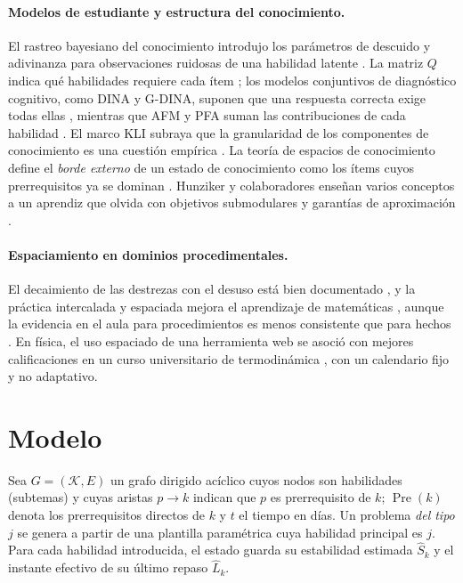 \documentclass[runningheads]{llncs}
\newcommand{\Pre}{\operatorname{Pre}}
\newcommand{\Sh}{\hat S}
\newcommand{\Lh}{\hat L}
\begin{document}
\paragraph{Modelos de estudiante y estructura del conocimiento.} El rastreo bayesiano del conocimiento introdujo los parámetros de descuido y adivinanza para observaciones ruidosas de una habilidad latente \cite{corbett1994}. La matriz $Q$ indica qué habilidades requiere cada ítem \cite{tatsuoka1983}; los modelos conjuntivos de diagnóstico cognitivo, como DINA y G-DINA, suponen que una respuesta correcta exige todas ellas \cite{junker2001,delatorre2011}, mientras que AFM y PFA suman las contribuciones de cada habilidad \cite{cen2006,pavlik2009}. El marco KLI subraya que la granularidad de los componentes de conocimiento es una cuestión empírica \cite{koedinger2012}. La teoría de espacios de conocimiento define el \emph{borde externo} de un estado de conocimiento como los ítems cuyos prerrequisitos ya se dominan \cite{doignon1985}. Hunziker y colaboradores enseñan varios conceptos a un aprendiz que olvida con objetivos submodulares y garantías de aproximación \cite{hunziker2019}.

\paragraph{Espaciamiento en dominios procedimentales.} El decaimiento de las destrezas con el desuso está bien documentado \cite{arthur1998}, y la práctica intercalada y espaciada mejora el aprendizaje de matemáticas \cite{rohrer2015}, aunque la evidencia en el aula para procedimientos es menos consistente que para hechos \cite{barzagar2019}. En física, el uso espaciado de una herramienta web se asoció con mejores calificaciones en un curso universitario de termodinámica \cite{voice2020}, con un calendario fijo y no adaptativo.

\section{Modelo}
\label{sec:modelo}

Sea $G=(\mathcal K,E)$ un grafo dirigido acíclico cuyos nodos son habilidades (subtemas) y cuyas aristas $p\to k$ indican que $p$ es prerrequisito de $k$; $\Pre(k)$ denota los prerrequisitos directos de $k$ y $t$ el tiempo en días. Un problema \emph{del tipo} $j$ se genera a partir de una plantilla paramétrica cuya habilidad principal es $j$. Para cada habilidad introducida, el estado guarda su estabilidad estimada $\Sh_k$ y el instante efectivo de su último repaso $\Lh_k$.
\end{document}
